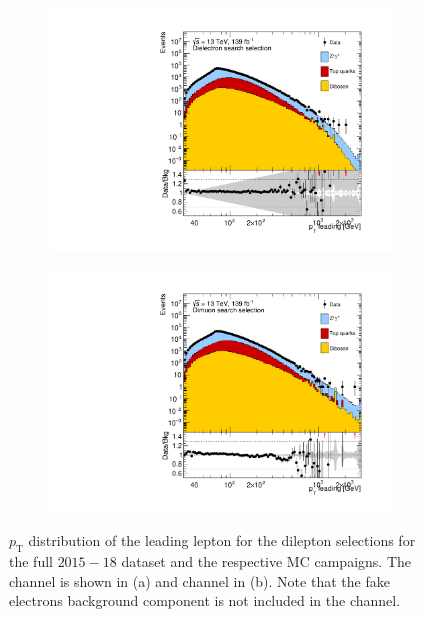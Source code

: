 \begin{figure}[]
    \centering
    \begin{subfigure}[b]{0.49\textwidth}
        \centering
        \includegraphics[width=\textwidth]{figures/analysis/datamc/dataMCcompare/ee_pt1_log100.pdf}
        \caption{}
        \label{fig:datamc:eept1}
    \end{subfigure}
    \begin{subfigure}[b]{0.49\textwidth}
        \centering
        \includegraphics[width=\textwidth]{figures/analysis/datamc/dataMCcompare/uu_pt1_log100.pdf}
        \caption{}
        \label{fig:datamc:uupt1}
    \end{subfigure}
    \caption[$p_\mathrm{T}$ distribution of the leading lepton for the dilepton selections for the full $2015-18$ dataset and the respective MC campaigns.]{$p_\mathrm{T}$ distribution of the leading lepton for the dilepton selections for the full $2015-18$ dataset and the respective MC campaigns. The \ee channel is shown in (a) and \mumu channel in (b). Note that the fake electrons background component is not included in the \ee channel.}
    \label{fig:datamc:pt1}
\end{figure}

